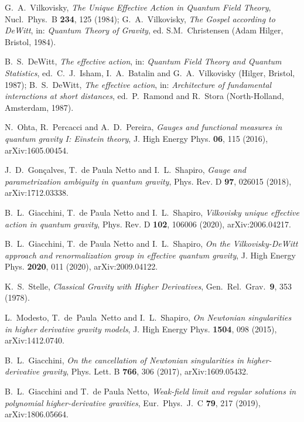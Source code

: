 \documentclass[aps,prd,a4paper,twocolumn,showpacs,showkeys,preprintnumbers,amsmath,amssymb,nofootinbib]{revtex4-2}
\numberwithin{equation}{section}
\begin{document}
\begin{thebibliography}{}
  G.~A.~Vilkovisky,
  {\it The Unique Effective Action in Quantum Field Theory},
  Nucl.\ Phys.\ B {\bf 234}, 125 (1984);
  G.~A.~Vilkovisky,
  {\it The Gospel according to DeWitt}, in: {\it Quantum Theory of Gravity},
  ed. S.M.~Christensen (Adam Hilger, Bristol, 1984).

  B.~S.~DeWitt,
  {\it The effective action},
  in: {\it Quantum Field Theory and Quantum Statistics},
  ed.~C.~J.~Isham, I.~A.~Batalin and G.~A.~Vilkovisky (Hilger, Bristol, 1987);
  B.~S.~DeWitt,
  {\it The effective action},
  in: {\it Architecture of fundamental interactions at short distances},
  ed.~P.~Ramond and R.~Stora
  (North-Holland, Amsterdam, 1987).

N.~Ohta, R.~Percacci and A.~D.~Pereira,
{\it Gauges and functional measures in quantum gravity I: Einstein theory},
J. High Energy Phys. \textbf{06}, 115 (2016),
arXiv:1605.00454.

J.~D.~Gon\c{c}alves, T.~de Paula Netto and I.~L.~Shapiro,
{\it Gauge and parametrization ambiguity in quantum gravity},
Phys. Rev. D \textbf{97}, 026015 (2018),
arXiv:1712.03338.

B.~L.~Giacchini, T.~de Paula Netto and I.~L.~Shapiro,
{\it Vilkovisky unique effective action in quantum gravity},
Phys. Rev. D \textbf{102}, 106006  (2020),
arXiv:2006.04217. 

B.~L.~Giacchini, T.~de Paula Netto and I.~L.~Shapiro,
{\it On the Vilkovisky-DeWitt approach and renormalization group in effective quantum gravity},
J. High Energy Phys. \textbf{2020}, 011 (2020),
arXiv:2009.04122.

K.~S.~Stelle,
{\it Classical Gravity with Higher Derivatives},
Gen.\ Rel.\ Grav.\  {\bf 9}, 353 (1978).

L.~Modesto, T.~de~Paula~Netto and I.~L.~Shapiro,
{\it On Newtonian singularities in higher derivative gravity models},
J. High Energy Phys. {\bf 1504}, 098 (2015), arXiv:1412.0740.

B.~L.~Giacchini,
{\it On the cancellation of Newtonian singularities in higher-derivative gravity},
Phys. Lett. B {\bf 766}, 306 (2017), arXiv:1609.05432.

B.~L.~Giacchini and T.~de Paula Netto,
{\it Weak-field limit and regular solutions in polynomial higher-derivative gravities},
Eur.\ Phys.\ J.\ C {\bf 79}, 217 (2019),
arXiv:1806.05664.


\end{thebibliography}
\end{document}
